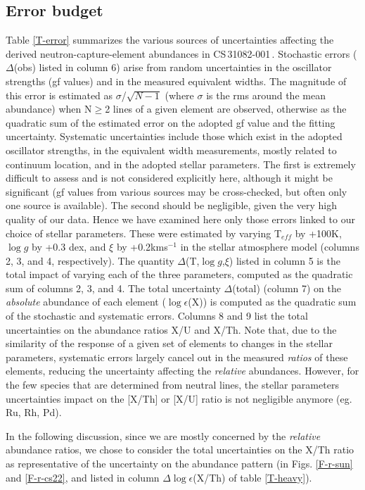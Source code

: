 \documentclass{aa}
\def\cs{CS\,31082-001\,}
\begin{document}
   \subsection{Error budget} \label{errors}

Table \ref{T-error} summarizes the various sources of uncertainties affecting
the derived neutron-capture-element abundances in \cs.  Stochastic errors
($\Delta$(obs) listed in column 6) arise from random uncertainties in
the oscillator strengths (gf values) and in the measured equivalent widths.
The magnitude of this error is estimated as $\sigma$/$\sqrt{N-1}$
(where $\sigma$ is the rms around the mean abundance) when N$\geq$2 lines of a
given element are observed, otherwise as the quadratic sum of the estimated
error on the adopted gf value and the fitting uncertainty. Systematic
uncertainties include those which exist in the adopted oscillator strengths,
in the equivalent width measurements, mostly related to continuum location, and
in the adopted stellar parameters. The first
is extremely difficult to assess and is not considered explicitly here,
although it might be significant 
(gf values from various sources may be cross-checked, but often 
only one source is available).  The second should be negligible,
given the very high quality of our data.  Hence we have examined here only
those errors linked to our choice of stellar parameters.  These were estimated
by varying T$_{eff}$ by +100K, $\log g$ by +0.3 dex, and $\xi$ by +0.2kms$^{-1}$
in the stellar atmosphere model (columns 2, 3, and 4, respectively).
The quantity $\Delta$(T,$\log g$,$\xi$) listed in column 5 is the total impact
of varying each of the three parameters, computed as the quadratic sum of
columns 2, 3, and 4. The total uncertainty $\Delta$(total) (column 7)
on the {\it absolute} abundance of each element ($\log \epsilon$(X))
is computed as the quadratic sum of the stochastic
and systematic errors.  Columns 8 and 9 list the total uncertainties
on the abundance ratios X/U and X/Th.  Note that, due to the similarity of the 
response of a given set of elements to changes in the stellar parameters, 
systematic errors largely cancel out in the measured {\it ratios} of these 
elements, reducing the uncertainty affecting the {\it relative}
abundances. However, for the few species that are determined from
neutral lines, the stellar parameters uncertainties impact on the
[X/Th] or [X/U] ratio is not negligible anymore (eg. Ru, Rh, Pd).

In the following discussion, since we are mostly concerned by the {\it
relative} abundance ratios, we chose to consider the total uncertainties on the
X/Th ratio as representative of the uncertainty on the abundance pattern (in
Figs. \ref{F-r-sun} and \ref{F-r-cs22}, and listed in column $\Delta \log
\epsilon$(X/Th) of table \ref{T-heavy}).
\end{document}
